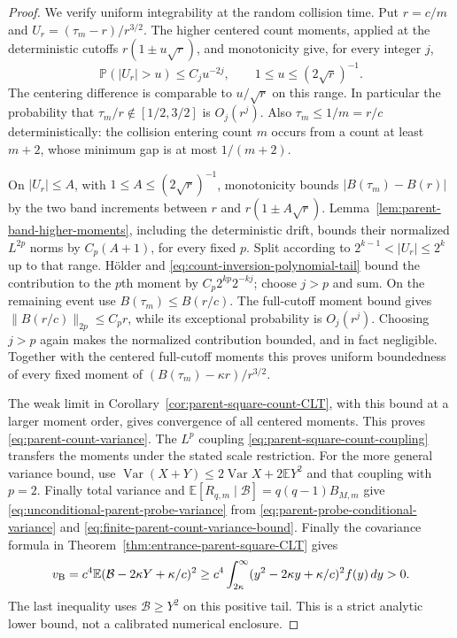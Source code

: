 \documentclass[11pt,letterpaper]{article}
\newcommand{\PP}{\mathbb P}\newcommand{\EE}{\mathbb E}
\begin{document}
\begin{proof}
We verify uniform integrability at the random collision time.
Put $r=c/m$ and $U_r=(\tau_m-r)/r^{3/2}$.
The higher centered count moments, applied at the deterministic
cutoffs $r(1\pm u\sqrt r)$, and monotonicity give, for every
integer $j$,
\begin{equation}\label{eq:count-inversion-polynomial-tail}
 \PP(|U_r|>u)\le C_j u^{-2j},
               \qquad 1\le u\le(2\sqrt r)^{-1}.
\end{equation}
The centering difference is comparable to $u/\sqrt r$ on
this range. In particular the probability that
$\tau_m/r\notin[1/2,3/2]$ is $O_j(r^j)$.
Also $\tau_m\le1/m=r/c$ deterministically: the collision
entering count $m$ occurs from a count at least $m+2$, whose
minimum gap is at most $1/(m+2)$.

On $|U_r|\le A$, with $1\le A\le(2\sqrt r)^{-1}$,
monotonicity bounds $|B(\tau_m)-B(r)|$ by the two band
increments between $r$ and $r(1\pm A\sqrt r)$.
Lemma~\ref{lem:parent-band-higher-moments}, including the
deterministic drift, bounds their normalized $L^{2p}$ norms
by $C_p(A+1)$, for every fixed $p$.
Split according to $2^{k-1}<|U_r|\le2^k$ up to that range.
H\"older and \eqref{eq:count-inversion-polynomial-tail} bound
the contribution to the $p$th moment by
$C_p2^{kp}2^{-kj}$; choose $j>p$ and sum.
On the remaining event use $B(\tau_m)\le B(r/c)$.
The full-cutoff moment bound gives
$\|B(r/c)\|_{2p}\le C_pr$, while its exceptional probability
is $O_j(r^j)$. Choosing $j>p$ again makes the normalized
contribution bounded, and in fact negligible.
Together with the centered full-cutoff moments this proves
uniform boundedness of every fixed moment of
$(B(\tau_m)-\kappa r)/r^{3/2}$.

The weak limit in Corollary~\ref{cor:parent-square-count-CLT},
with this bound at a larger moment order, gives convergence of
all centered moments. This proves
\eqref{eq:parent-count-variance}.
The $L^p$ coupling \eqref{eq:parent-square-count-coupling}
transfers the moments under the stated scale restriction.
For the more general variance bound, use
$\operatorname{Var}(X+Y)\le2\operatorname{Var}X+2\EE Y^2$
and that coupling with $p=2$.
Finally total variance and
$\EE[R_{q,m}\mid\mathcal B]=q(q-1)B_{M,m}$ give
\eqref{eq:unconditional-parent-probe-variance} from
\eqref{eq:parent-probe-conditional-variance} and
\eqref{eq:finite-parent-count-variance-bound}.
Finally the covariance formula in
Theorem~\ref{thm:entrance-parent-square-CLT} gives
\[
 v_{\rm B}=c^4\EE(\mathcal B-2\kappa Y+\kappa/c)^2
 \ge c^4\int_{2\kappa}^\infty
          (y^2-2\kappa y+\kappa/c)^2 f(y)\,dy>0.
\]
The last inequality uses $\mathcal B\ge Y^2$ on this positive
tail. This is a strict analytic lower bound, not a calibrated
numerical enclosure.
\end{proof}
\end{document}
